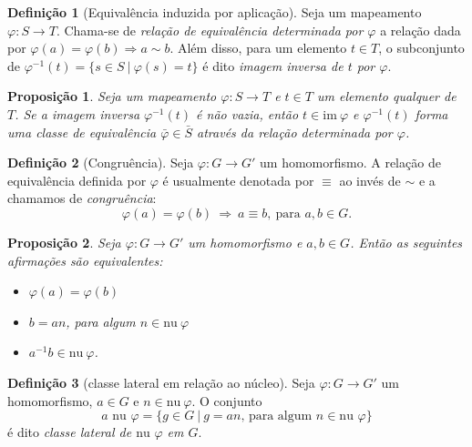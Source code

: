 \documentclass[a4paper,12pt]{report}
\theoremstyle{plain}
\newtheorem{proposicao}{Proposição}[section]
\theoremstyle{definition}
\newtheorem{definicao}{Definição}[section]
\begin{document}
\begin{definicao}[Equivalência induzida por aplicação]
	Seja um mapeamento \(\varphi: S \longrightarrow T\).
	Chama-se de \emph{relação de equivalência determinada por \(\varphi\)} a
	relação dada por \(\varphi(a) = \varphi(b) \Rightarrow a \sim b\). Além
	disso, para um elemento \(t\in T\), o subconjunto de
	\(\varphi^{-1}(t) = \{s \in S\ | \ \varphi(s) = t\}\) é dito
	\emph{imagem inversa de \(t\) por \(\varphi\)}.
\end{definicao}

\begin{proposicao}
	Seja um mapeamento \(\varphi: S \longrightarrow T\)
	e \(t \in T\) um elemento qualquer de \(T\). Se a imagem inversa
	\(\varphi^{-1}(t)\) é não vazia, então \(t \in \text{im}\ \varphi\) e
	\(\varphi^{-1}(t)\) forma uma classe de equivalência
	\(\bar{\varphi}\in \bar{S}\) através da relação determinada por
	\(\varphi\).	
\end{proposicao}

\begin{definicao}[Congruência]
	Seja \(\varphi: G\longrightarrow G'\) um
	homomorfismo. A relação de equivalência definida por \(\varphi\) é
	usualmente denotada por \(\equiv\) ao invés de \(\sim\) e a chamamos de
	\emph{congruência}:
	\[\varphi(a) = \varphi(b) \ \Rightarrow \ a \equiv b, \ \text{para }a,b \in G.\]	
\end{definicao}

\begin{proposicao}
	Seja \(\varphi: G\longrightarrow G'\) um
	homomorfismo e \(a,b \in G\). Então as seguintes afirmações são
	equivalentes:
	\begin{itemize}
		\item
		\(\varphi(a) = \varphi(b)\)
		\item
		\(b = an\), para algum \(n\in \text{nu} \ \varphi\)
		\item
		\(a^{-1}b \in \text{nu} \ \varphi\).
	\end{itemize}	
\end{proposicao}

\begin{definicao}[classe lateral em relação ao núcleo]
	Seja \(\varphi: G\longrightarrow G'\) um
	homomorfismo, \(a \in G\) e \(n\in\text{nu}\ \varphi\). O conjunto
	\[a\text{ nu }\varphi = \{g\in G \ | \ g = an \text{, para algum } n\in\text{nu }\varphi\}\] é dito \emph{classe lateral de \(\text{nu }\varphi\) em \(G\)}.	
\end{definicao}
\end{document}
